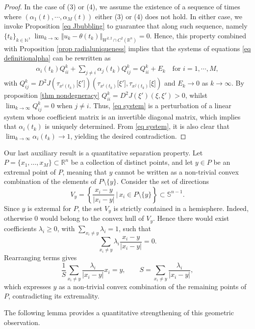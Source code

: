 \documentclass[11pt,letterpaper,reqno]{amsart}
\newcommand{\N}{\mathbb{N}}
\newcommand{\R}{\mathbb{R}}
\theoremstyle{plain}%
\theoremstyle{definition}
\numberwithin{equation}{section}
\numberwithin{figure}{section}
\begin{document}
\begin{proof}
In the case of (3) or (4), we assume the existence of a sequence of times where $(\alpha_1(t), \cdots, \alpha_M(t))$ either (3) or (4) does not hold. In either case, we invoke Proposition \ref{eq Jbubbling} to guarantee that along such sequence, namely $\{t_k\}_{k\in \N}$, $\lim_{k\to \infty} \Vert u_k -\theta(t_k)\Vert_{W^{2,2}\cap C^2(\R^n)}=0$. Hence, this property combined with Proposition \ref{prop radialuniqueness} implies that the systems of equations \eqref{eq definitionalpha} can be rewritten as
\begin{eqnarray}\label{eq system}   
\alpha_i(t_k) Q_{ii}^k
+\sum_{j\neq i} \alpha_j(t_k) Q_{ij}^k= Q_{ii}^k +E_k \quad \mbox{for $i=1, \cdots, M$},
\end{eqnarray}
with $Q_{ij}^k = D^2J(\tau_{x^i(t_k)}\big[\xi'\big])(\tau_{x^i(t_k)}\big[\xi'\big], \tau_{x^j(t_k)}\big[\xi\big])$ and $E_k \to 0$ as $k\to \infty$. By proposition \ref{thm nondegneracy} $Q_{ii}^k = D^2J(\xi')(\xi, \xi')>0$, whilst $\lim_{k\to \infty} Q_{ij}^k = 0$ when $j\neq i$. Thus, \eqref{eq system} is a perturbation of a linear system whose coefficient matrix is an invertible diagonal matrix, which implies that $\alpha_i(t_k)$ is uniquely determined. From \eqref{eq system}, it is also clear that $\lim_{k\to \infty}\alpha_i(t_k)\to 1$, yielding the desired contradiction.
\end{proof}

Our last auxiliary result is a quantitative separation property. Let 
\(P=\{x_1,\dots,x_M\}\subset \mathbb R^n\) be a collection of distinct points, and let \(y\in P\) be an extremal point of \(P\), meaning that \(y\) cannot be written as a non-trivial convex combination of the elements of \(P\setminus\{y\}\). Consider the set of directions
\[
V_y
=
\left\{
\frac{x_i-y}{|x_i-y|}
\,\Bigg|\,
x_i\in P\setminus\{y\}
\right\}
\subset \mathbb S^{n-1}.
\]
Since \(y\) is extremal for \(P\), the set \(V_y\) is strictly contained in a hemisphere. Indeed, otherwise \(0\) would belong to the convex hull of \(V_y\). Hence there would exist coefficients \(\lambda_i\ge 0\), with \(\sum_{x_i\ne y}\lambda_i=1\), such that
\[
\sum_{x_i\neq y}
\lambda_i
\frac{x_i-y}{|x_i-y|}
=0.
\]
Rearranging terms gives
\[
\frac{1}{S}
\sum_{x_i\neq y}
\frac{\lambda_i}{|x_i-y|}
x_i
=
y,
\qquad
S
=
\sum_{x_i\neq y}
\frac{\lambda_i}{|x_i-y|},
\]
which expresses \(y\) as a non-trivial convex combination of the remaining points of \(P\), contradicting its extremality.

The following lemma provides a quantitative strengthening of this geometric observation.
\end{document}
